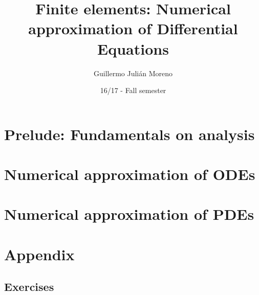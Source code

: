 \documentclass[palatino]{epflnotes}
\title{Finite elements: Numerical approximation of Differential Equations}
\author{Guillermo Julián Moreno}
\date{16/17 - Fall semester}
\begin{document}
\frontmatter
\pagestyle{plain}
\maketitle

\tableofcontents
\mainmatter

\part{Prelude: Fundamentals on analysis}


\part{Numerical approximation of ODEs}


\part{Numerical approximation of PDEs}


\appendix
\part{Appendix}

\chapter{Exercises}


\backmatter


\printindex
\end{document}
